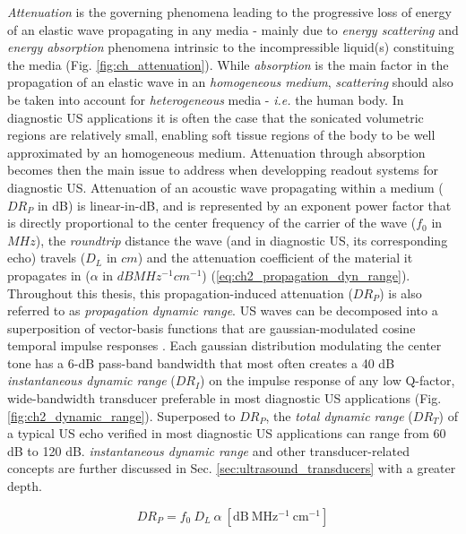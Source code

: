 \emph{Attenuation} is the governing phenomena leading to the progressive loss of energy of an elastic wave 
propagating in any media - mainly due to \emph{energy scattering} and \emph{energy absorption} phenomena intrinsic to the 
incompressible liquid(s) constituing the media (Fig. \ref{fig:ch_attenuation}). %
While \emph{absorption} is the main factor in the propagation of an elastic wave in an \emph{homogeneous medium}, 
\emph{scattering} should also be taken into account for \emph{heterogeneous} media - \emph{i.e.} the human body. In diagnostic US applications 
it is often the case that the sonicated volumetric regions are relatively small, enabling soft tissue regions of the body 
to be well approximated by an homogeneous medium. Attenuation through absorption becomes then the main 
issue to address when developping readout systems for diagnostic US. Attenuation 
of an acoustic wave propagating within a medium ($DR_P$ in dB) is linear-in-dB, and is represented by an exponent power factor that is directly proportional to 
the center frequency of the carrier of the wave ($f_0$ in $MHz$), the \emph{roundtrip} distance the wave (and in diagnostic US, its corresponding echo) 
travels ($D_L$ in $cm$) and the attenuation coefficient of the material it propagates in ($\alpha$ in $dB MHz^{-1} cm^{-1}$) (\ref{eq:ch2_propagation_dyn_range}). 
Throughout this thesis, this propagation-induced attenuation ($DR_P$) is also referred to as \emph{propagation dynamic range}. 
US waves can be decomposed into a superposition of vector-basis functions that are gaussian-modulated cosine 
temporal impulse responses \cite{}. Each gaussian distribution modulating the center tone has a 6-dB pass-band bandwidth 
that most often creates a 40 dB \emph{instantaneous dynamic range} ($DR_I$) on the impulse response of 
any low Q-factor, wide-bandwidth transducer preferable in most diagnostic US applications \cite{} (Fig. \ref{fig:ch2_dynamic_range}). Superposed 
to $DR_P$, the \emph{total dynamic range} ($DR_T$) of a typical US echo verified in most diagnostic US applications can range 
from 60 dB to 120 dB. \emph{instantaneous dynamic range} and other transducer-related concepts are 
further discussed in Sec. \ref{sec:ultrasound_transducers} with a greater depth.

\begin{equation}
  DR_P = f_0 \ D_L \ \alpha \ \mathrm{[dB \ MHz^{-1} \ cm^{-1}]}
  \label{eq:ch2_propagation_dyn_range}
\end{equation}

